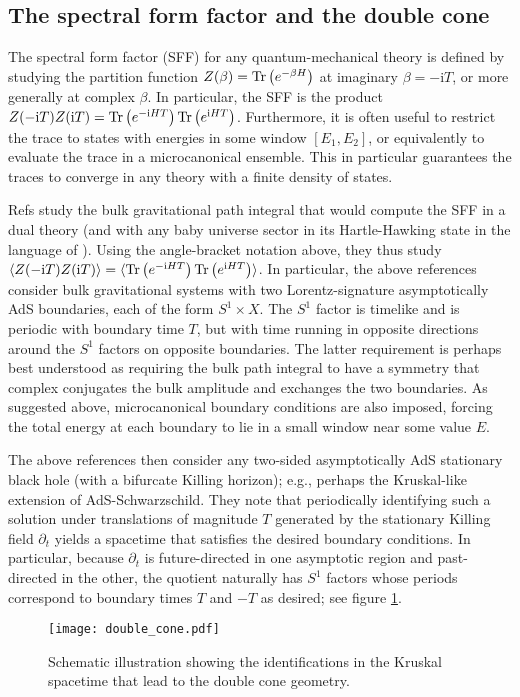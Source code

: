 \documentclass[11pt]{article}
\renewcommand{\i}{\mathrm{i}}
\begin{document}
\subsection{The spectral form factor and the double cone}

The spectral form factor (SFF) for any quantum-mechanical theory is defined by studying the partition function
$Z(\beta) = {\rm Tr} \left(e^{-\beta H} \right)$
at imaginary $\beta =-\i T$, or more generally at complex $\beta$.
In particular, the SFF is the product
$Z(-\i T)Z(\i T) = {\rm Tr}  \left(e^{-\i HT} \right){\rm Tr} \left(e^{\i HT} \right)$.
Furthermore, it is often useful to restrict the trace to states with energies in some window $[E_1,E_2]$, or equivalently to evaluate the trace in a microcanonical ensemble.
This in particular guarantees the traces to converge in any theory with a finite density of states.

Refs \cite{SSS-1,Saad:2019lba,Stanford:2019vob} study the bulk gravitational path integral that would compute the SFF in a dual theory (and with any baby universe sector in its Hartle-Hawking state in the language of \cite{Marolf:2020xie}).
Using the angle-bracket notation above, they thus study $\langle Z(-\i T)Z(\i T) \rangle= \langle {\rm Tr} \left(e^{-\i HT} \right){\rm Tr} \left(e^{\i HT} \right)\rangle$. 
In particular, the above references consider bulk gravitational systems with two Lorentz-signature asymptotically AdS boundaries, each of the form $S^1 \times X$.  The $S^1$ factor  is timelike and is periodic with boundary time $T$, but with time running in opposite directions around the $S^1$ factors on opposite boundaries.
The latter requirement is perhaps best understood as requiring the bulk path integral to have a symmetry that complex conjugates the bulk amplitude and exchanges the two boundaries.
As suggested above, microcanonical boundary conditions are also imposed, forcing the total energy at each boundary to lie in a small window near some value $E$.

The above references then consider any two-sided asymptotically AdS stationary black hole (with a bifurcate Killing horizon); e.g., perhaps the Kruskal-like extension of AdS-Schwarzschild.  
They note that periodically identifying such a solution under translations of magnitude $T$ generated by the stationary Killing field $\partial_t$  yields a spacetime that satisfies the desired boundary conditions.  
In particular, because $\partial_t$ is future-directed in one asymptotic region and past-directed in the other, the quotient naturally has $S^1$ factors whose periods correspond to boundary times $T$ and $-T$ as desired; see figure \ref{fig:ident}.
\begin{figure}[htb]
    \centering
    \texttt{[image: double\_cone.pdf]}
    \caption{Schematic illustration showing the identifications in the Kruskal spacetime that lead to the double cone geometry.}
    \label{fig:ident}
\end{figure}
\end{document}
